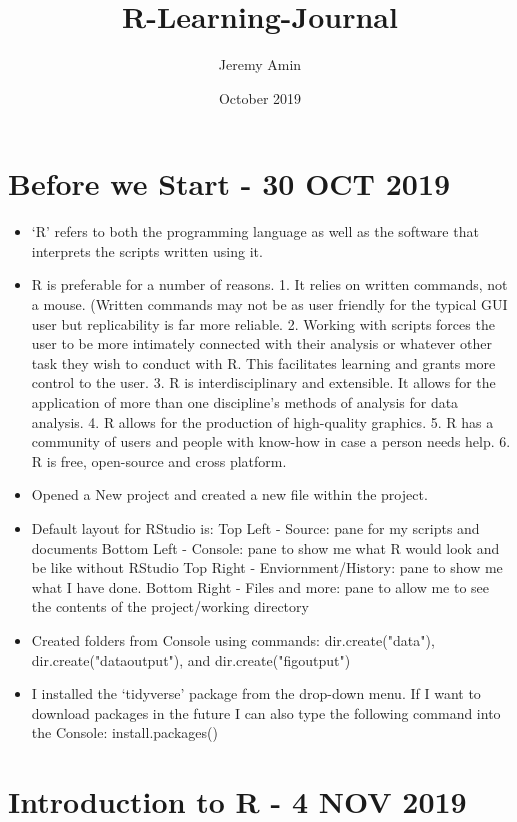 \documentclass{article}
\title{R-Learning-Journal}
\author{Jeremy Amin}
\date{October 2019}
\begin{document}
\maketitle

\section{Before we Start - 30 OCT 2019}

\begin{itemize}
    \item `R' refers to both the programming language as well as the software that interprets the scripts written using it.
    \item R is preferable for a number of reasons. 1. It relies on written commands, not a mouse. (Written commands may not be as user friendly for the typical GUI user but replicability is far more reliable. 2. Working with scripts forces the user to be more intimately connected with their analysis or whatever other task they wish to conduct with R. This facilitates learning and grants more control to the user. 3. R is interdisciplinary and extensible. It allows for the application of more than one discipline's methods of analysis for data analysis. 4. R allows for the production of high-quality graphics. 5. R has a community of users and people with know-how in case a person needs help. 6. R is free, open-source and cross platform.
    \item Opened a New project and created a new file within the project.
    \item Default layout for RStudio is: Top Left - Source: pane for my scripts and documents
Bottom Left - Console: pane to show me what R would look and be like without RStudio
Top Right - Enviornment/History: pane to show me what I have done.
Bottom Right - Files and more: pane to allow me to see the contents of the project/working directory
\item Created folders from Console using commands: dir.create("data"),
dir.create("data\textunderscore output"), and
dir.create("fig\textunderscore output")
\item I installed the `tidyverse' package from the drop-down menu. If I want to download packages in the future I can also type the following command into the Console: install.packages()

\end{itemize}

\section{Introduction to R - 4 NOV 2019}
\end{document}
